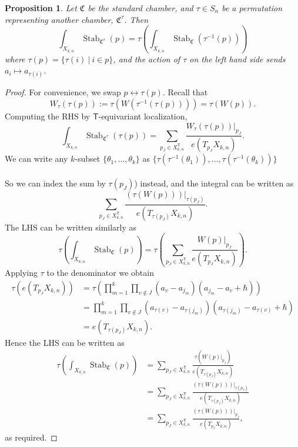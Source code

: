 \documentclass[12 pt]{article}
\theoremstyle{plain}
\theoremstyle{plain}
\theoremstyle{plain}
\theoremstyle{plain}
\theoremstyle{plain}
\theoremstyle{plain}
\theoremstyle{plain}
\newtheorem{proposition}{Proposition}[section]
\theoremstyle{plain}
\theoremstyle{plain}
\theoremstyle{plain}
\theoremstyle{remark}
\theoremstyle{remark}
\theoremstyle{definition}
\theoremstyle{definition}
\theoremstyle{definition}
\theoremstyle{definition}
\theoremstyle{definition}
\theoremstyle{definition}
\DeclareMathOperator{\Stab}{Stab}
\newcommand{\bT}{\mathsf{T}}
\newcommand{\chamb}{\mathfrak{C}}
\begin{document}
\begin{proposition}\label{chamber-dependence}
Let $\chamb$ be the standard chamber, and $\tau \in S_n$ be a permutation representing another chamber, $\chamb^\tau$. Then
\[
\int_{X_{k,n}}\Stab_{\chamb^{\tau}}(p) = \tau\left( \int_{X_{k,n}} \Stab_{\chamb}(\tau^{-1}(p)) \right)
\]
where $\tau(p) = \{\tau(i)\ |\ i \in p\}$, and the action of $\tau$ on the left hand side sends $a_i \mapsto a_{\tau(i)}$.
\end{proposition}

\begin{proof}
For convenience, we swap $p\leftrightarrow \tau(p)$. Recall that 
\[
W_{\tau}(\tau(p)):=\tau(W(\tau^{-1}(\tau(p))))=\tau(W(p)).
\]
Computing the RHS by $\bT$-equivariant localization,
\[
\int_{X_{k,n}}\Stab_{\chamb^{\tau}}(\tau(p))=\sum_{p_{J}\in X_{k,n}^{\bT}}\frac{W_{\tau}(\tau(p))|_{p_{J}}}{e(T_{p_{J}}X_{k,n})}.
\]
We can write any $k$-subset $\{\theta_{1},\dots,\theta_{k}\}$ as $\{\tau(\tau^{-1}(\theta_{1})),\dots,\tau(\tau^{-1}(\theta_{k}))\}$\\\\
So we can index the sum by $\tau(p_{J})$) instead, and the integral can be written as
\[
\sum_{p_{J}\in X_{k,n}^{\bT}}\frac{(\tau(W(p)))|_{\tau(p_{J})}}{e(T_{\tau(p_{J})}X_{k,n})}.
\]
The LHS can be written similarly as
\[
\tau\left( \int_{X_{k,n}} \Stab_{\chamb}(p) \right)=\tau\left(\sum_{p_{J}\in X_{k,n}^{\bT}}\frac{W(p)|_{p_{J}}}{e(T_{p_{J}}X_{k,n})}\right).
\]
Applying $\tau$ to the denominator we obtain
\begin{align*}
\tau(e(T_{p_{J}}X_{k,n}))&=\tau\left(\prod\limits_{m=1}^{k}\prod\limits_{v\notin J}(a_{v}-a_{j_{m}})(a_{j_{m}}-a_{v}+\hbar)\right)\\&=\prod\limits_{m=1}^{k}\prod\limits_{v\notin J}(a_{\tau(v)}-a_{\tau(j_{m})})(a_{\tau(j_{m})}-a_{\tau(v)}+\hbar)\\
&=e(T_{\tau(p_{J})}X_{k,n}).
\end{align*}
Hence the LHS can be written as
\begin{align*}
\tau\left( \int_{X_{k,n}} \Stab_{\chamb}(p) \right)&=\sum_{p_{J}\in X_{k,n}^{\bT}}\frac{\tau(W(p)|_{p_{J}})}{e(T_{\tau(p_{J})}X_{k,n})}\\
&=\sum_{p_{J}\in X_{k,n}^{\bT}}\frac{(\tau(W(p)))|_{\tau(p_{J})}}{e(T_{\tau(p_{J})}X_{k,n})}\\
&=\sum_{p_{J}\in X_{k,n}^{\bT}}\frac{(\tau(W(p)))|_{p_{J}}}{e(T_{p_{J}}X_{k,n})},
\end{align*}
as required.
\end{proof}
\end{document}
